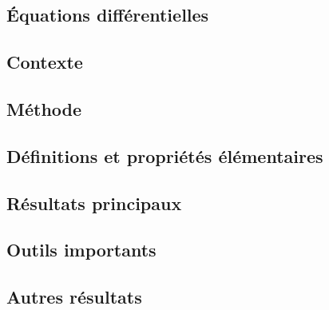 \documentclass[11pt,a4paper]{article}
\begin{document}
\newpage
\begin{center}  
\section*{Équations différentielles} 
\end{center}




\subsection*{Contexte}

\subsection*{Méthode}

\subsection*{Définitions et propriétés élémentaires}

\subsection*{Résultats principaux}

\subsection*{Outils importants}


\subsection*{Autres résultats}
\end{document}
